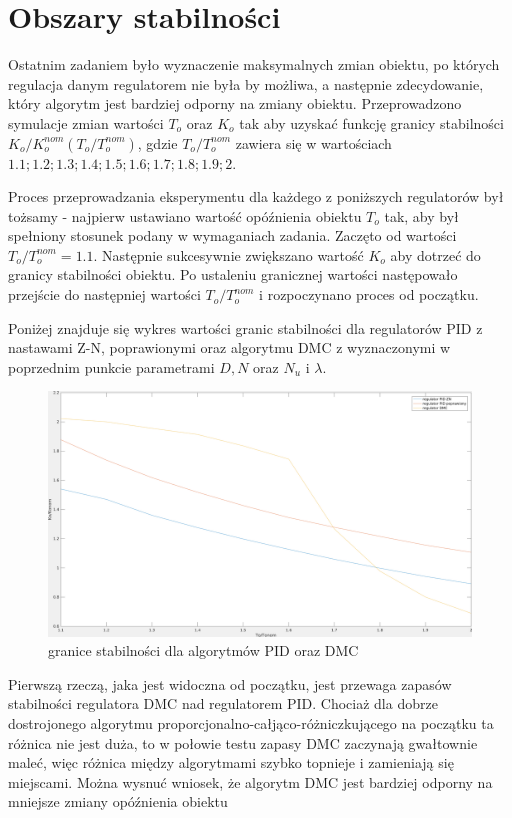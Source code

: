 \documentclass[fleqn]{article}
\begin{document}
	\section{Obszary stabilności}

Ostatnim zadaniem było wyznaczenie maksymalnych zmian obiektu, po których regulacja danym regulatorem nie była by możliwa, a następnie zdecydowanie, który algorytm jest bardziej odporny na zmiany obiektu. Przeprowadzono symulacje zmian wartości $T_o$ oraz $K_o$ tak aby uzyskać funkcję granicy stabilności $K_o/K_o^{nom}(T_o/T_o^{nom})$, gdzie $T_o/T_o^{nom}$ zawiera się w wartościach ${1.1;1.2;1.3;1.4;1.5;1.6;1.7;1.8;1.9;2}$.

Proces przeprowadzania eksperymentu dla każdego z poniższych regulatorów był tożsamy - najpierw ustawiano wartość opóźnienia obiektu $T_o$ tak, aby był spełniony stosunek podany w wymaganiach zadania. Zaczęto od wartości $T_o/T_o^{nom}=1.1$. Następnie sukcesywnie zwiększano wartość $K_o$ aby dotrzeć do granicy stabilności obiektu. Po ustaleniu granicznej wartości następowało przejście do następniej wartości $T_o/T_o^{nom}$ i rozpoczynano proces od początku.

Poniżej znajduje się wykres wartości granic stabilności dla regulatorów PID z nastawami Z-N, poprawionymi oraz algorytmu DMC z wyznaczonymi w poprzednim punkcie parametrami $D, N$ oraz $N_u$ i $\lambda$.

\begin{figure}[H]
	\includegraphics[width=\textwidth]{scripts/zad62.png}
	\caption{granice stabilności dla algorytmów PID oraz DMC}
\end{figure}

Pierwszą rzeczą, jaka jest widoczna od początku, jest przewaga zapasów stabilności regulatora DMC nad regulatorem PID. Chociaż dla dobrze dostrojonego algorytmu proporcjonalno-całjąco-różniczkującego na początku ta różnica nie jest duża, to w połowie testu zapasy DMC zaczynają gwałtownie maleć, więc różnica między algorytmami szybko topnieje i zamieniają się miejscami. Można wysnuć wniosek, że algorytm DMC jest bardziej odporny na mniejsze zmiany opóźnienia obiektu
\end{document}
